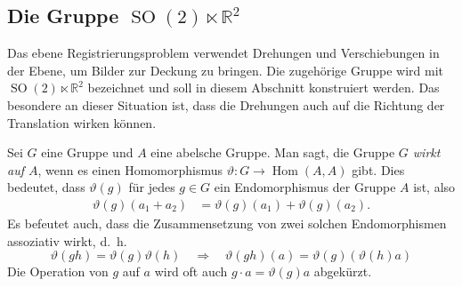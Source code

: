 \subsection{Die Gruppe $\operatorname{SO}(2)\ltimes \mathbb{R}^2$
\label{buch:nichtkomm:motivation:subsection:so2lr2}}
Das ebene Registrierungsproblem verwendet Drehungen und Verschiebungen
in der Ebene, um Bilder zur Deckung zu bringen.
Die zugehörige Gruppe wird mit $\operatorname{SO}(2)\ltimes\mathbb{R}^2$
bezeichnet und soll in diesem Abschnitt konstruiert werden.
Das besondere an dieser Situation ist, dass die Drehungen auch auf
die Richtung der Translation wirken können.



\begin{definition}
Sei $G$ eine Gruppe und $A$ eine abelsche Gruppe.
Man sagt, die Gruppe {\em $G$ wirkt auf $A$}, wenn
es einen Homomorphismus $\vartheta\colon G\to\operatorname{Hom}(A,A)$ gibt.
Dies bedeutet, dass $\vartheta(g)$ für jedes $g\in G$ ein Endomorphismus
der Gruppe $A$ ist, also
\begin{align*}
\vartheta(g)(a_1+a_2)&=\vartheta(g)(a_1) + \vartheta(g)(a_2).
\end{align*}
Es befeutet auch, dass die Zusammensetzung von zwei solchen
Endomorphismen assoziativ wirkt, d.~h.
\[
\vartheta(gh)=\vartheta(g)\vartheta(h)
\quad\Rightarrow\quad
\vartheta(gh)(a) = \vartheta(g)(\vartheta(h)a)
\]
Die Operation von $g$ auf $a$ wird oft auch $g\cdot a = \vartheta(g)a$
abgekürzt.
\end{definition}

